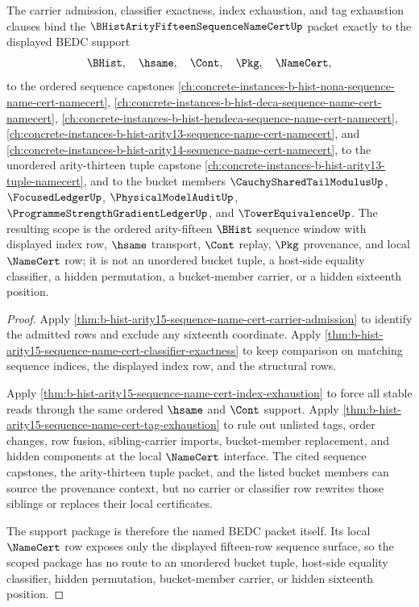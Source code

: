 \begin{theorem}
\label{thm:b-hist-arity15-sequence-name-cert-scoped-support-package}
The carrier admission, classifier exactness, index exhaustion, and tag exhaustion clauses bind the $\BHistArityFifteenSequenceNameCertUp$ packet exactly to the displayed BEDC support
$$
\BHist,\quad \hsame,\quad \Cont,\quad \Pkg,\quad \NameCert,
$$
to the ordered sequence capstones \autoref{ch:concrete-instances-b-hist-nona-sequence-name-cert-namecert}, \autoref{ch:concrete-instances-b-hist-deca-sequence-name-cert-namecert}, \autoref{ch:concrete-instances-b-hist-hendeca-sequence-name-cert-namecert}, \autoref{ch:concrete-instances-b-hist-arity13-sequence-name-cert-namecert}, and \autoref{ch:concrete-instances-b-hist-arity14-sequence-name-cert-namecert}, to the unordered arity-thirteen tuple capstone \autoref{ch:concrete-instances-b-hist-arity13-tuple-namecert}, and to the bucket members $\CauchySharedTailModulusUp$, $\FocusedLedgerUp$, $\PhysicalModelAuditUp$, $\ProgrammeStrengthGradientLedgerUp$, and $\TowerEquivalenceUp$. The resulting scope is the ordered arity-fifteen $\BHist$ sequence window with displayed index row, $\hsame$ transport, $\Cont$ replay, $\Pkg$ provenance, and local $\NameCert$ row; it is not an unordered bucket tuple, a host-side equality classifier, a hidden permutation, a bucket-member carrier, or a hidden sixteenth position.
\end{theorem}
\begin{proof}
Apply \autoref{thm:b-hist-arity15-sequence-name-cert-carrier-admission} to identify the admitted rows and exclude any sixteenth coordinate. Apply \autoref{thm:b-hist-arity15-sequence-name-cert-classifier-exactness} to keep comparison on matching sequence indices, the displayed index row, and the structural rows.

Apply \autoref{thm:b-hist-arity15-sequence-name-cert-index-exhaustion} to force all stable reads through the same ordered $\hsame$ and $\Cont$ support. Apply \autoref{thm:b-hist-arity15-sequence-name-cert-tag-exhaustion} to rule out unlisted tags, order changes, row fusion, sibling-carrier imports, bucket-member replacement, and hidden components at the local $\NameCert$ interface. The cited sequence capstones, the arity-thirteen tuple packet, and the listed bucket members can source the provenance context, but no carrier or classifier row rewrites those siblings or replaces their local certificates.

The support package is therefore the named BEDC packet itself. Its local $\NameCert$ row exposes only the displayed fifteen-row sequence surface, so the scoped package has no route to an unordered bucket tuple, host-side equality classifier, hidden permutation, bucket-member carrier, or hidden sixteenth position.
\end{proof}

